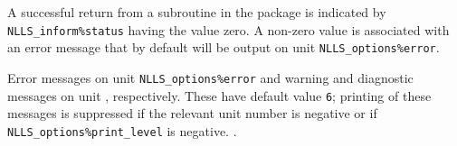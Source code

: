 \documentclass{spec}
\begin{document}
\hslerrors

A successful return from a subroutine in the package is indicated by
{\tt NLLS\_inform\%status} having the value zero.
A non-zero value is associated with an error message that by default will
be output on unit {\tt NLLS\_options\%error}.



\hslgeneral


\hslio
   Error messages on unit {\tt NLLS\_options\%error} and warning
   and diagnostic messages on unit ,
   respectively. These have default value {\tt 6};
   printing of these messages is suppressed if the relevant unit number
   is negative or if {\tt NLLS\_options\%print\_level} is negative.
.

\hslmethod
\label{method}



\hslexample




\end{document}
